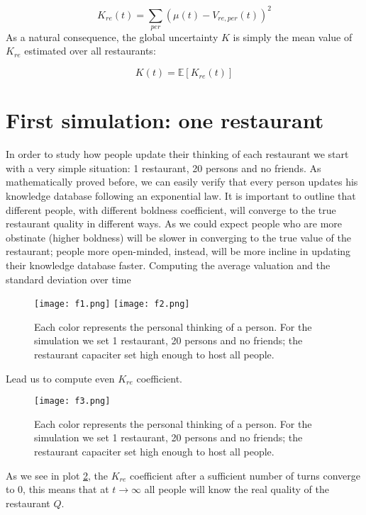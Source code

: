 \documentclass[12pt]{book}
\begin{document}
\begin{equation}
  {K_{re}}\left( t \right) = {\sum\limits_{per} {\left( {\mu \left( t \right) - {V_{re,per}}\left( t \right)} \right)} ^2}
\end{equation}
As a natural consequence, the global uncertainty $K$ is simply the mean value of $K_{re}$ estimated over all restaurants: 

\begin{equation}
  K\left( t \right) = \mathbb{E}\left[ {{K_{re}}\left( t \right)} \right]
\end{equation}



\section{First simulation: one restaurant}

In order to study how people update their thinking of each restaurant we start with a very simple situation: 1 restaurant, 20 persons and no friends. As  mathematically proved before, we can easily verify that every person updates his knowledge database following an exponential law.
It is important to outline that different people, with different boldness coefficient, will converge to the true restaurant quality in different ways. As we could expect people who are more obstinate (higher boldness) will be slower in converging to the true value of the restaurant; people more open-minded, instead, will be more incline in updating their knowledge database faster.
Computing the average valuation and the standard deviation over time

\begin{figure}[h!]
  \centering
  \texttt{[image: f1.png]}
  \texttt{[image: f2.png]}
  \caption{Each color represents the personal thinking of a person. For the simulation we set 1 restaurant, 20 persons and no friends; the restaurant capaciter set high enough to host all people.}
  \label{fig:First simulation}
\end{figure}


Lead us to compute even $K_{re}$ coefficient. 
\begin{figure}[h!]
  \centering
  \texttt{[image: f3.png]}
  \caption{Each color represents the personal thinking of a person. For the simulation we set 1 restaurant, 20 persons and no friends; the restaurant capaciter set high enough to host all people.}
  \label{fig:First simulation}
\end{figure}
As we see in plot \ref{fig:First simulation}, the $K_{re}$ coefficient after a sufficient number of turns converge to $0$, this means that at $t \to \infty$ all people will know the real quality of the restaurant $Q$.
\end{document}
